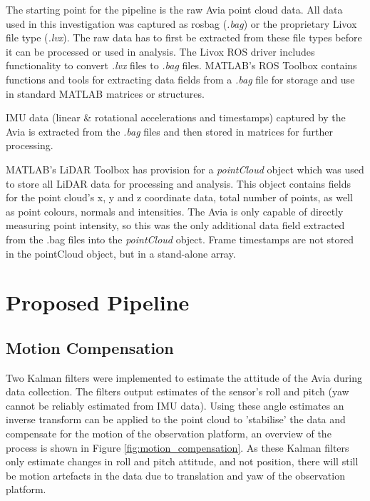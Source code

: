 The starting point for the pipeline is the raw Avia point cloud data. All data used in this investigation was captured as rosbag (\emph{.bag}) or the proprietary Livox file type (\emph{.lvx}). The raw data has to first be extracted from these file types before it can be processed or used in analysis. The Livox \ac{ROS} driver includes functionality to convert \emph{.lvx} files to \emph{.bag} files. MATLAB's \ac{ROS} Toolbox contains functions and tools for extracting data fields from a \emph{.bag} file for storage and use in standard MATLAB matrices or structures.

\ac{IMU} data (linear \& rotational accelerations and timestamps) captured by the Avia is extracted from the \emph{.bag} files and then stored in matrices for further processing.

MATLAB's \ac{LiDAR} Toolbox has provision for a \emph{pointCloud} object which was used to store all \ac{LiDAR} data for processing and analysis. This object contains fields for the point cloud's x, y and z coordinate data, total number of points, as well as point colours, normals and intensities. The Avia is only capable of directly measuring point intensity, so this was the only additional data field extracted from the .bag files into the \emph{pointCloud} object. Frame timestamps are not stored in the pointCloud object, but in a stand-alone array.

\section{Proposed Pipeline}
\label{sec:ch6.section3}

\subsection{Motion Compensation}
\label{sec:ch6.section3.subsec1}

Two Kalman filters were implemented to estimate the attitude of the Avia during data collection. The filters output estimates of the sensor's roll and pitch (yaw cannot be reliably estimated from \ac{IMU} data). Using these angle estimates an inverse transform can be applied to the point cloud to 'stabilise' the data and compensate for the motion of the observation platform, an overview of the process is shown in Figure \ref{fig:motion_compensation}. As these Kalman filters only estimate changes in roll and pitch attitude, and not position, there will still be motion artefacts in the data due to translation and yaw of the observation platform. 

